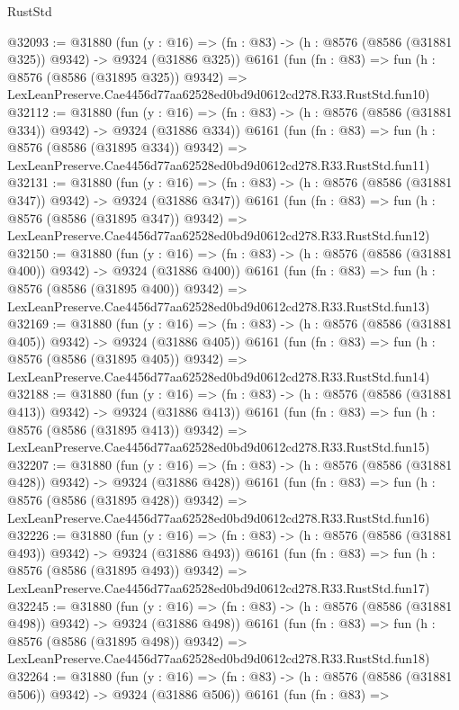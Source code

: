 \begin{lexlean}{RustStd}
\begin{coremodule}
@32093 := @31880
    (fun (y : @16) => (fn : @83) -> (h : @8576 (@8586 (@31881 @325)) @9342) -> @9324 (@31886 @325))
    @6161
    (fun (fn : @83) =>
    fun (h : @8576 (@8586 (@31895 @325)) @9342) =>
    LexLeanPreserve.Cae4456d77aa62528ed0bd9d0612cd278.R33.RustStd.fun10)
@32112 := @31880
    (fun (y : @16) => (fn : @83) -> (h : @8576 (@8586 (@31881 @334)) @9342) -> @9324 (@31886 @334))
    @6161
    (fun (fn : @83) =>
    fun (h : @8576 (@8586 (@31895 @334)) @9342) =>
    LexLeanPreserve.Cae4456d77aa62528ed0bd9d0612cd278.R33.RustStd.fun11)
@32131 := @31880
    (fun (y : @16) => (fn : @83) -> (h : @8576 (@8586 (@31881 @347)) @9342) -> @9324 (@31886 @347))
    @6161
    (fun (fn : @83) =>
    fun (h : @8576 (@8586 (@31895 @347)) @9342) =>
    LexLeanPreserve.Cae4456d77aa62528ed0bd9d0612cd278.R33.RustStd.fun12)
@32150 := @31880
    (fun (y : @16) => (fn : @83) -> (h : @8576 (@8586 (@31881 @400)) @9342) -> @9324 (@31886 @400))
    @6161
    (fun (fn : @83) =>
    fun (h : @8576 (@8586 (@31895 @400)) @9342) =>
    LexLeanPreserve.Cae4456d77aa62528ed0bd9d0612cd278.R33.RustStd.fun13)
@32169 := @31880
    (fun (y : @16) => (fn : @83) -> (h : @8576 (@8586 (@31881 @405)) @9342) -> @9324 (@31886 @405))
    @6161
    (fun (fn : @83) =>
    fun (h : @8576 (@8586 (@31895 @405)) @9342) =>
    LexLeanPreserve.Cae4456d77aa62528ed0bd9d0612cd278.R33.RustStd.fun14)
@32188 := @31880
    (fun (y : @16) => (fn : @83) -> (h : @8576 (@8586 (@31881 @413)) @9342) -> @9324 (@31886 @413))
    @6161
    (fun (fn : @83) =>
    fun (h : @8576 (@8586 (@31895 @413)) @9342) =>
    LexLeanPreserve.Cae4456d77aa62528ed0bd9d0612cd278.R33.RustStd.fun15)
@32207 := @31880
    (fun (y : @16) => (fn : @83) -> (h : @8576 (@8586 (@31881 @428)) @9342) -> @9324 (@31886 @428))
    @6161
    (fun (fn : @83) =>
    fun (h : @8576 (@8586 (@31895 @428)) @9342) =>
    LexLeanPreserve.Cae4456d77aa62528ed0bd9d0612cd278.R33.RustStd.fun16)
@32226 := @31880
    (fun (y : @16) => (fn : @83) -> (h : @8576 (@8586 (@31881 @493)) @9342) -> @9324 (@31886 @493))
    @6161
    (fun (fn : @83) =>
    fun (h : @8576 (@8586 (@31895 @493)) @9342) =>
    LexLeanPreserve.Cae4456d77aa62528ed0bd9d0612cd278.R33.RustStd.fun17)
@32245 := @31880
    (fun (y : @16) => (fn : @83) -> (h : @8576 (@8586 (@31881 @498)) @9342) -> @9324 (@31886 @498))
    @6161
    (fun (fn : @83) =>
    fun (h : @8576 (@8586 (@31895 @498)) @9342) =>
    LexLeanPreserve.Cae4456d77aa62528ed0bd9d0612cd278.R33.RustStd.fun18)
@32264 := @31880
    (fun (y : @16) => (fn : @83) -> (h : @8576 (@8586 (@31881 @506)) @9342) -> @9324 (@31886 @506))
    @6161
    (fun (fn : @83) =>

\end{coremodule}
\end{lexlean}
